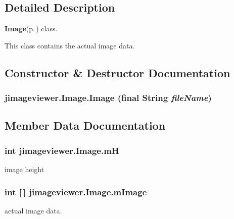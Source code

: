\subsection{Detailed Description}
{\bf Image}{\rm (p.\,\pageref{classjimageviewer_1_1_image})} class. 

This class contains the actual image data. 



\subsection{Constructor \& Destructor Documentation}
\subsubsection{\setlength{\rightskip}{0pt plus 5cm}jimageviewer.Image.Image (final String {\em file\-Name})}\label{classjimageviewer_1_1_image_e96c692c44a80f9618978a166ec4ad75}




\subsection{Member Data Documentation}
\subsubsection{\setlength{\rightskip}{0pt plus 5cm}int {\bf jimageviewer.Image.m\-H}\hspace{0.3cm}{\tt  [package]}}\label{classjimageviewer_1_1_image_61251012b9e88e8cb1e53048b08b8fdb}


image height 

\subsubsection{\setlength{\rightskip}{0pt plus 5cm}int [$\,$] {\bf jimageviewer.Image.m\-Image}\hspace{0.3cm}{\tt  [package]}}\label{classjimageviewer_1_1_image_b882e8545a17959da0f0abf562c2b4a4}


actual image data. 

